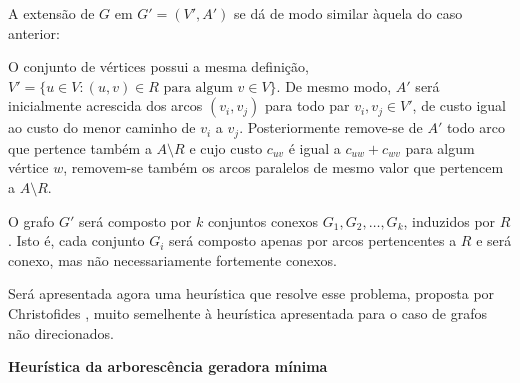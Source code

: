 \documentclass[12pt, a4paper]{article}
\begin{document}
        A extensão de $G$ em $G' = (V', A')$ se dá de modo similar àquela do caso anterior:

        O conjunto de vértices possui a mesma definição, $V' = \{u \in V : (u, v) \in R \text{ para algum } v \in V\}$. 
        De mesmo modo, $A'$ será inicialmente acrescida dos arcos $(v_i, v_j)$ para todo par $v_i, v_j \in V'$, de custo igual ao custo do menor caminho de $v_i$ a $v_j$.
        Posteriormente remove-se de $A'$ todo arco que pertence também a $A \setminus R$ e cujo custo $c_{uv}$ é igual a $c_{uw} + c_{wv}$ para algum vértice $w$, removem-se também os arcos paralelos de mesmo valor que pertencem a $A \setminus R$.

		O grafo $G'$ será composto por $k$ conjuntos conexos $G_1, G_2, \dots, G_k$, induzidos por $R$. 
		Isto é, cada conjunto $G_i$ será composto apenas por arcos pertencentes a $R$ e será conexo, mas não necessariamente fortemente conexos.

        Será apresentada agora uma heurística que resolve esse problema, proposta por Christofides \cite{christofides-86}, muito semelhente à heurística apresentada para o caso de grafos não direcionados.

	\textbf{Heurística da arborescência geradora mínima}
\end{document}
